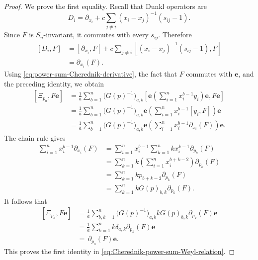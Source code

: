\documentclass[10pt,a4paper]{amsart}
\newcommand{\be}{\mathbf{e}}
\begin{document}
\begin{proof}
	We prove the first equality.
	Recall that  Dunkl operators are
	\[
	  D_i
	  =
	  \partial_{x_i}
	  +
	  c\sum_{j\neq i}(x_i-x_j)^{-1}(s_{ij}-1).
	\]
	Since \(F\) is \(S_n\)-invariant, it commutes with every \(s_{ij}\).
	Therefore
	\[
	\begin{aligned}
	  {}[D_i,F]
	  &=
	  [\partial_{x_i},F]
	  +
	  c\sum_{j\neq i}
	  \left[
	    (x_i-x_j)^{-1}(s_{ij}-1),
	    F
	  \right]                                                     \\
	  &=
	  \partial_{x_i}(F).
	\end{aligned}
	\]
	Using \eqref{eq:power-sum-Cherednik-derivative}, the fact that
	\(F\) commutes with \(\be\), and the preceding identity, we obtain
	\[
	\begin{aligned}
	  {}[ \Xi_{p_a} ,F\be]
	  &=
	  \frac{1}{a}\sum_{b=1}^n
	  \bigl(G(p)^{-1}\bigr)_{a, b}
	  \left[
	    \be\left(\sum_{i=1}^n x_i^{b-1}y_i\right)\be,
	    F\be
	  \right]                                                     \\
	  &=
	  \frac{1}{a}\sum_{b=1}^n
	  \bigl(G(p)^{-1}\bigr)_{a, b}
	  \be\left(
	    \sum_{i=1}^n x_i^{b-1}[y_i,F]
	  \right)\be                                                  \\
	  &=
	  \frac{1}{a}\sum_{b=1}^n
	  \bigl(G(p)^{-1}\bigr)_{a, b}
	  \be\left(
	    \sum_{i=1}^n x_i^{b-1}\partial_{x_i}(F)
	  \right)\be.
	\end{aligned}
	\]
	The chain rule gives
	\[
	\begin{aligned}
	  \sum_{i=1}^n x_i^{b-1}\partial_{x_i} (F)
	  &=
	  \sum_{i=1}^n x_i^{b-1}
	  \sum_{k=1}^n
	  kx_i^{k-1}\partial_{p_k}(F )                              \\
	  &=
	  \sum_{k=1}^n
	  k\left(\sum_{i=1}^n x_i^{b+k-2}\right)
	  \partial_{p_k}(F)                                          \\
	  &=
	  \sum_{k=1}^n
	  k p_{b+k-2}\partial_{p_k}(F)                               \\
	  &=
	  \sum_{k=1}^n
	  kG(p)_{b, k}\partial_{p_k}(F).
	\end{aligned}
	\]
	It follows that
	\[
	\begin{aligned}
	  {}[ \Xi_{p_a} ,F\be]
	  &=
	  \frac{1}{a}
	  \sum_{b,k=1}^n
	  \bigl(G(p)^{-1}\bigr)_{a, b}
	  kG(p)_{b, k}\partial_{p_k}(F)\be                             \\
	  &=
	  \frac{1}{a}
	  \sum_{k=1}^n
	  k\delta_{a, k}\partial_{p_k}(F)\be                           \\
	  &=
	  \,\partial_{p_a}(F)\be.
	\end{aligned}
	\]
	This proves the first identity in
	\eqref{eq:Cherednik-power-sum-Weyl-relation}. 
	

\end{proof}
\end{document}
